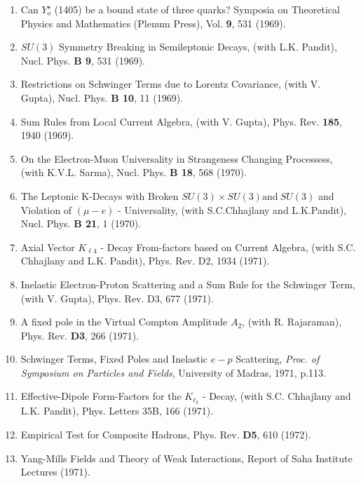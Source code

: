 \begin{enumerate}
\item Can $Y^\star_o$ (1405) be a bound state of three quarks? Symposia
on Theoretical Physics and Mathematics (Plenum Press), Vol. {\bf 9}, 531
(1969).

\item $SU(3)$ Symmetry Breaking in Semileptonic Decays, (with L.K.
Pandit), Nucl. Phys. {\bf B 9}, 531 (1969).

\item Restrictions on Schwinger Terms due to Lorentz Covariance, (with
V. Gupta), Nucl. Phys. {\bf B 10}, 11 (1969).

\item Sum Rules from Local Current Algebra, (with V. Gupta), Phys. Rev.
{\bf 185}, 1940 (1969).

\item On the Electron-Muon Universality in Strangeness Changing
Processess, (with K.V.L. Sarma), Nucl. Phys. {\bf B 18}, 568 (1970).

\item The Leptonic K-Decays with Broken $SU(3) \times SU(3) \mbox{and}
\ SU(3)$ and Violation of $(\mu - e)$ - Universality, (with S.C.Chhajlany
and L.K.Pandit), Nucl. Phys. {\bf B 21}, 1 (1970).

\item Axial Vector $K_{\ell 4}$ - Decay From-factors based on Current
Algebra, (with S.C. Chhajlany and L.K. Pandit), Phys. Rev. D2, 1934
(1971).

\item Inelastic Electron-Proton Scattering and a Sum Rule for the
Schwinger Term, (with V. Gupta), Phys. Rev. D3, 677 (1971).

\item A fixed pole in the Virtual Compton Amplitude $A_2$, (with R.
Rajaraman), Phys. Rev. {\bf D3}, 266 (1971).

\item Schwinger Terms, Fixed Poles and Inelastic $e-p$ Scattering, {\it Proc.
of Symposium on Particles and Fields}, University of Madras, 1971, p.113.

\item Effective-Dipole Form-Factors for the $K_{\ell_3}$ - Decay, (with
S.C. Chhajlany and L.K. Pandit), Phys. Letters 35B, 166 (1971).

\item Empirical Test for Composite Hadrons, Phys. Rev. {\bf D5}, 610
(1972).

\item Yang-Mills Fields and Theory of Weak Interactions, Report of Saha
Institute Lectures (1971).


\end{enumerate}
